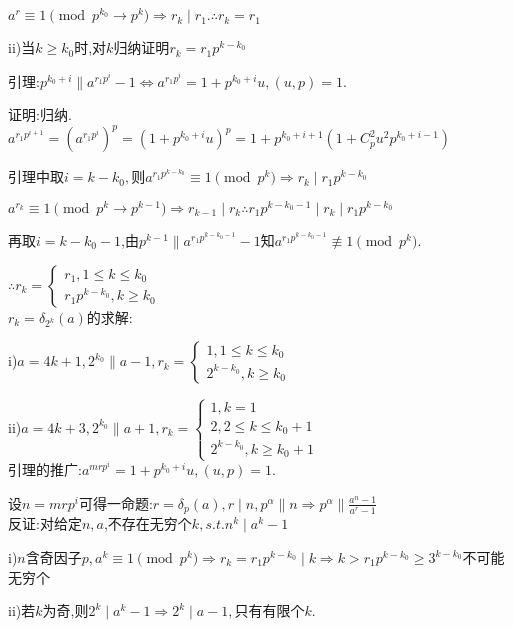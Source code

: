 $ a^r\equiv1 \pmod{p^{k_0}\rightarrow p^k}\Rightarrow r_k\mid r_1. \therefore r_k=r_1$

ii)当$ k\ge k_0$时,对$k $归纳证明$ r_k=r_1 p^{k-k_0}$

引理:$ p^{k_0+i}\parallel a^{r_1p^i}-1\Leftrightarrow a^{r_1p^i}=1+p^{k_0+i}u,(u,p)=1$.

证明:归纳.
$ a^{r_1p^{i+1}}=(a^{r_1p^i})^p=(1+p^{k_0+i}u)^p=1+p^{k_0+i+1}(1+C_p^2u^2p^{k_0+i-1})$

引理中取$ i=k-k_0,$则$ a^{r_1p^{k-k_0}}\equiv 1 \pmod{p^k}\Rightarrow r_k \mid r_1p^{k-k_0}$

$ a^{r_k}\equiv 1\pmod{p^k \rightarrow p^{k-1}}\Rightarrow r_{k-1}\mid r_k \therefore r_1p^{k-k_0-1}\mid r_k \mid r_1p^{k-k_0}$

再取$ i=k-k_0-1$,由$ p^{k-1}\parallel a^{r_1p^{k-k_0-1}}-1$知$ a^{r_1p^{k-k_0-1}}\not \equiv 1 \pmod{p^k}.$

$  \therefore r_k=\left\{ \begin{matrix}r_1,1\le k \le k_0 \\ r_1p^{k-k_0},k\ge k_0 \end{matrix}\right. $
\\

$ r_k=\delta_{2^k}(a)$的求解:

i)$ a=4k+1,2^{k_0}\parallel a-1,r_k=\left\{ \begin{matrix} 1,1\le k \le k_0 \\ 2^{k-k_0},k\ge k_0 \end{matrix}\right.$ 

ii)$ a=4k+3,2^{k_0}\parallel a+1,r_k=\left\{ \begin{matrix} 1,k=1 \\ 2,2\le k\le k_0+1 \\ 2^{k-k_0},k\ge k_0+1 \end{matrix}\right.$
\\

引理的推广:$ a^{mrp^i}=1+p^{k_0+i}u,(u,p)=1.$

设$ n=mrp^i$可得一命题:$ r=\delta_p(a),r\mid n,p^{\alpha}\parallel n\Rightarrow p^{\alpha}\parallel \frac{a^n-1}{a^r-1} $
\\

反证:对给定$ n,a$,不存在无穷个$ k,s.t.n^k\mid a^k-1$

i)$ n$含奇因子$ p,a^k\equiv 1 \pmod {p^k}\Rightarrow r_k=r_1p^{k-k_0}\mid k\Rightarrow k>r_1p^{k-k_0}\ge 3^{k-k_0}$不可能无穷个

ii)若$ k$为奇,则$ 2^k\mid a^k-1\Rightarrow 2^k\mid a-1,$只有有限个$ k$.

